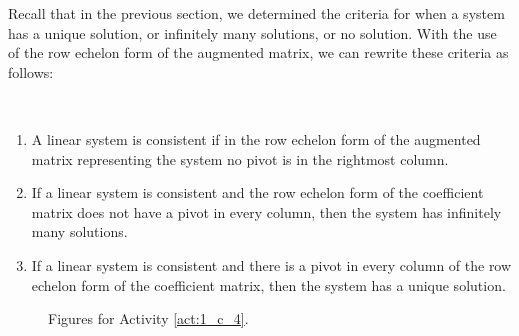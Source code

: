 
Recall that in the previous section, we determined the criteria for when a system has a unique solution, or infinitely many solutions, or no solution. With the use of the row echelon form of the augmented matrix, we can rewrite these criteria as follows:

\begin{theorem} ~
\begin{enumerate}
\item A linear system is consistent if in the row echelon form of the augmented matrix representing the system no pivot is in the rightmost column. 
\item If a linear system is consistent and the row echelon form of the coefficient matrix does not have a pivot in every column, then the system has infinitely many solutions. 
\item If a linear system is consistent and there is a pivot in every column of the row echelon form of the coefficient matrix, then the system has a  unique solution.
\end{enumerate}
\end{theorem}






\begin{figure}[ht]
\begin{center}
\begin{minipage}{1.75in}
\begin{center}
\end{center}
\end{minipage} %
\begin{minipage}{1.5in}
\begin{center}
\end{center}
\end{minipage} %
\begin{minipage}{1.5in}
\begin{center}
\end{center}
\end{minipage} 
\caption{Figures for Activity \ref{act:1_c_4}.}
\label{F:1_c_1}
\end{center}

\end{figure}

